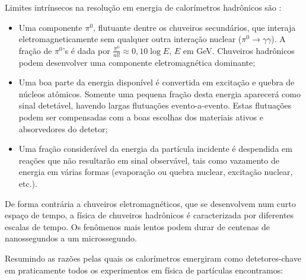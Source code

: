 Limites intrínsecos na resolução em energia de calorímetros hadrônicos são
\cite{hadcal}:

\begin{itemize}
  \item Uma componente $\pi^{0}$, flutuante dentre os chuveiros secundários, que
  interaja eletromagneticamente sem qualquer outra interação nuclear ($\pi^{0}
  \rightarrow \gamma\gamma$). A fração de $\pi^{0}$'s é dada por
  $\frac{\pi^{0}}{all} \approx 0,10 \log{E}$, $E$ em GeV. Chuveiros hadrônicos
  podem desenvolver uma componente eletromagnética dominante;

\item Uma boa parte da energia disponível é convertida em excitação e quebra
  de núcleos atômicos. Somente uma pequena fração desta energia aparecerá como
  sinal detetável, havendo largas flutuações evento-a-evento. Estas flutuações
  podem ser compensadas com a boas escolhas dos materiais ativos e absorvedores
  do detetor;

\item Uma fração considerável da energia da partícula incidente é despendida
  em reações que não resultarão em sinal observável, tais como vazamento de
  energia em várias formas (evaporação ou quebra nuclear, excitação nuclear,
  etc.).
\end{itemize}

De forma contrária a chuveiros eletromagnéticos, que se desenvolvem num curto
espaço de tempo, a física de chuveiros hadrônicos é caracterizada por
diferentes escalas de tempo. Os fenômenos mais lentos podem durar de centenas
de nanossegundos a um microssegundo.

Resumindo as razões pelas quais os calorímetros emergiram como detetores-chave
em praticamente todos os experimentos em física de partículas encontramos:


